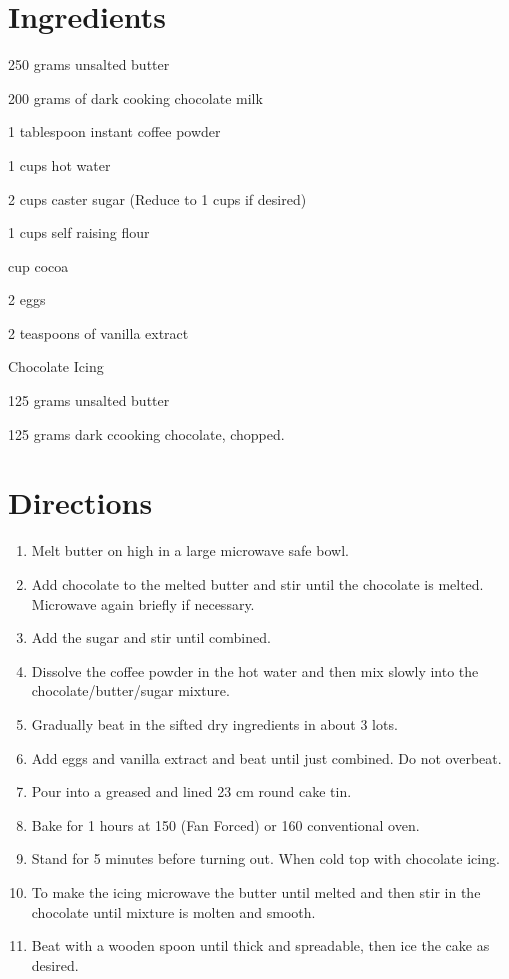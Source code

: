 
\bigskip
\section*{Ingredients}

\begin{ingredients-list}
	\item 250 grams unsalted butter
	\item 200 grams of dark cooking chocolate milk
	\item 1 tablespoon instant coffee powder
	\item 1 cups hot water
	\item 2 cups caster sugar (Reduce to 1 cups if desired)
	\item 1 cups self raising flour
	\item {} cup cocoa
	\item 2 eggs
	\item 2 teaspoons of vanilla extract
\end{ingredients-list}
Chocolate Icing
\begin{ingredients-list}
	\item 125 grams  unsalted butter
	\item 125 grams  dark ccooking chocolate, chopped.
\end{ingredients-list}

\section*{Directions}
\begin{enumerate}
	\item Melt butter on high in a large microwave safe bowl.
	\item Add chocolate to the melted butter and stir until the chocolate is melted.  Microwave again briefly if necessary.
	\item Add the sugar and stir until combined.
	\item Dissolve the coffee powder in the hot water and then mix slowly into the chocolate/butter/sugar mixture.
 	\item Gradually beat in the sifted dry ingredients in about 3 lots.
	\item Add eggs and vanilla extract and beat until just combined. Do not overbeat.
	\item Pour into a greased and lined 23 cm round cake tin.
	\item Bake for 1 hours at 150 \textcelsius (Fan Forced) or 160 \textcelsius conventional oven.
	\item Stand for 5 minutes before turning out.  When cold top with chocolate icing.
	\item To make the icing microwave the butter until melted and then stir in the chocolate until mixture is molten and smooth.
	\item Beat with a wooden spoon until thick and spreadable, then ice the cake as desired.
\end{enumerate}


